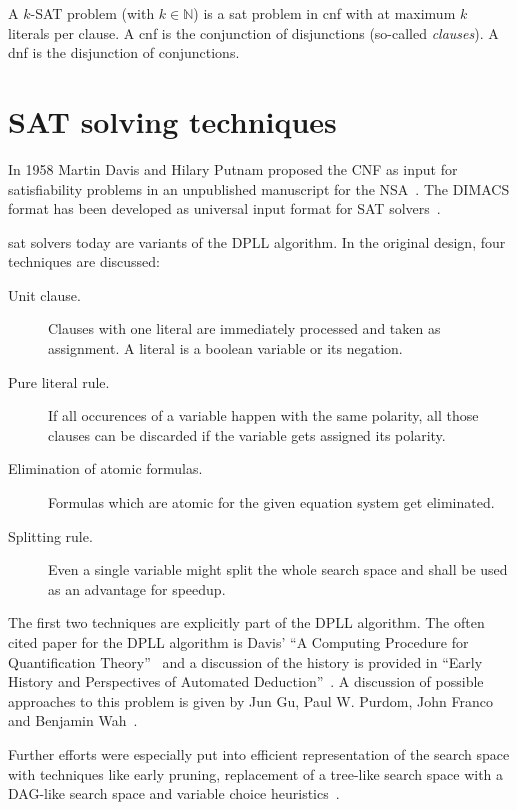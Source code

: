 A $k$-SAT problem (with $k \in \mathbb{N}$) is a \gls{sat} problem in \gls{cnf} with at maximum $k$ literals per clause. A \gls{cnf} is the conjunction of disjunctions (so-called \emph{clauses}). A \gls{dnf} is the disjunction of conjunctions.

\section{SAT solving techniques}
\label{sec:satsolvers}
%
In 1958 Martin Davis and Hilary Putnam proposed the CNF as input for satisfiability problems in an unpublished manuscript for the NSA~\cite{Sat20}. The DIMACS format has been developed as universal input format for SAT solvers~\cite{Sat09}.

\gls{sat} solvers today are variants of the DPLL algorithm. In the original design, four techniques are discussed:
\begin{description}
  \item[Unit clause.] Clauses with one literal are immediately processed and taken as assignment. A literal is a boolean variable or its negation.
  \item[Pure literal rule.] If all occurences of a variable happen with the same polarity, all those clauses can be discarded if the variable gets assigned its polarity.
  \item[Elimination of atomic formulas.] Formulas which are atomic for the given equation system get eliminated.
  \item[Splitting rule.] Even a single variable might split the whole search space and shall be used as an advantage for speedup.
\end{description}
%
The first two techniques are explicitly part of the DPLL algorithm. The often cited paper for the DPLL algorithm is Davis' ``A Computing Procedure for Quantification Theory''~\cite{Sat05} and a discussion of the history is provided in ``Early History and Perspectives of Automated Deduction''~\cite{Sat06}. A discussion of possible approaches to this problem is given by Jun Gu, Paul W. Purdom, John Franco and Benjamin Wah~\cite{Sat08}.

Further efforts were especially put into efficient representation of the search space with techniques like early pruning, replacement of a tree-like search space with a DAG-like search space and variable choice heuristics~\cite[24]{Sat20}.

